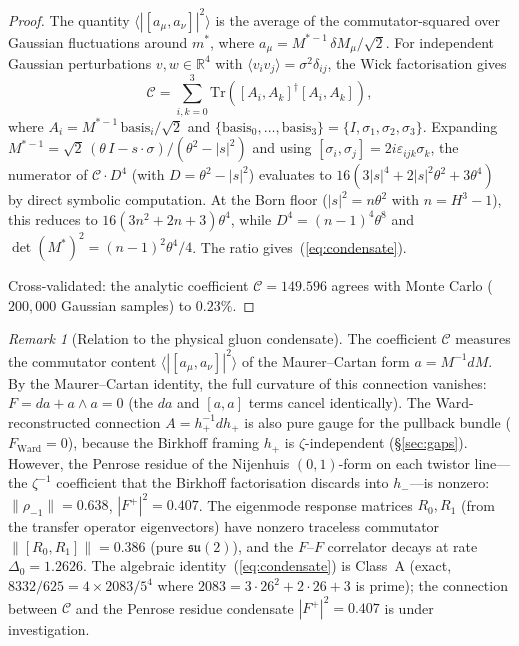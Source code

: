 \documentclass[11pt,a4paper]{article}
\theoremstyle{definition}
\theoremstyle{remark}
\newtheorem{remark}[theorem]{Remark}
\newcommand{\R}{\mathbb{R}}
\newcommand{\Tr}{\mathrm{Tr}}
\newcommand{\su}{\mathfrak{su}}
\begin{document}
\begin{proof}
The quantity $\langle|[a_\mu,a_\nu]|^2\rangle$ is the average of the commutator-squared over Gaussian fluctuations around $m^*$, where $a_\mu=M^{*-1}\,\delta M_\mu/\sqrt{2}$. For independent Gaussian perturbations $v,w\in\R^4$ with $\langle v_iv_j\rangle=\sigma^2\delta_{ij}$, the Wick factorisation gives
\[
\mathcal{C}=\sum_{i,k=0}^{3}\Tr([A_i,A_k]^\dagger[A_i,A_k]),
\]
where $A_i=M^{*-1}\,\mathrm{basis}_i/\sqrt{2}$ and $\{\mathrm{basis}_0,\ldots,\mathrm{basis}_3\}=\{I,\sigma_1,\sigma_2,\sigma_3\}$. Expanding $M^{*-1}=\sqrt{2}\,(\theta\,I-s\cdot\sigma)/({\theta^2-|s|^2})$ and using $[\sigma_i,\sigma_j]=2i\varepsilon_{ijk}\sigma_k$, the numerator of $\mathcal{C}\cdot D^4$ (with $D=\theta^2-|s|^2$) evaluates to $16(3|s|^4+2|s|^2\theta^2+3\theta^4)$ by direct symbolic computation. At the Born floor ($|s|^2=n\theta^2$ with $n=H^3-1$), this reduces to $16(3n^2+2n+3)\theta^4$, while $D^4=(n-1)^4\theta^8$ and $\det(M^*)^2=(n-1)^2\theta^4/4$. The ratio gives~(\ref{eq:condensate}).

Cross-validated: the analytic coefficient $\mathcal{C}=149.596$ agrees with Monte Carlo ($200{,}000$ Gaussian samples) to $0.23\%$.
\end{proof}

\begin{remark}[Relation to the physical gluon condensate]\label{rem:condensate_interpretation}
The coefficient $\mathcal{C}$ measures the commutator content $\langle|[a_\mu,a_\nu]|^2\rangle$ of the Maurer--Cartan form $a=M^{-1}dM$. By the Maurer--Cartan identity, the full curvature of this connection vanishes: $F=da+a\wedge a=0$ (the $da$ and $[a,a]$ terms cancel identically). The Ward-reconstructed connection $A=h_+^{-1}dh_+$ is also pure gauge for the pullback bundle ($F_{\mathrm{Ward}}=0$), because the Birkhoff framing $h_+$ is $\zeta$-independent (\S\ref{sec:gaps}). However, the Penrose residue of the Nijenhuis $(0,1)$-form on each twistor line---the $\zeta^{-1}$ coefficient that the Birkhoff factorisation discards into $h_-$---is nonzero: $\|\rho_{-1}\|=0.638$, $|F^+|^2=0.407$. The eigenmode response matrices $R_0,R_1$ (from the transfer operator eigenvectors) have nonzero traceless commutator $\|[R_0,R_1]\|=0.386$ (pure $\su(2)$), and the $F$--$F$ correlator decays at rate $\Delta_0=1.2626$. The algebraic identity~(\ref{eq:condensate}) is Class~A (exact, $8332/625=4\times 2083/5^4$ where $2083=3\cdot 26^2+2\cdot 26+3$ is prime); the connection between $\mathcal{C}$ and the Penrose residue condensate $|F^+|^2=0.407$ is under investigation.
\end{remark}
\end{document}
